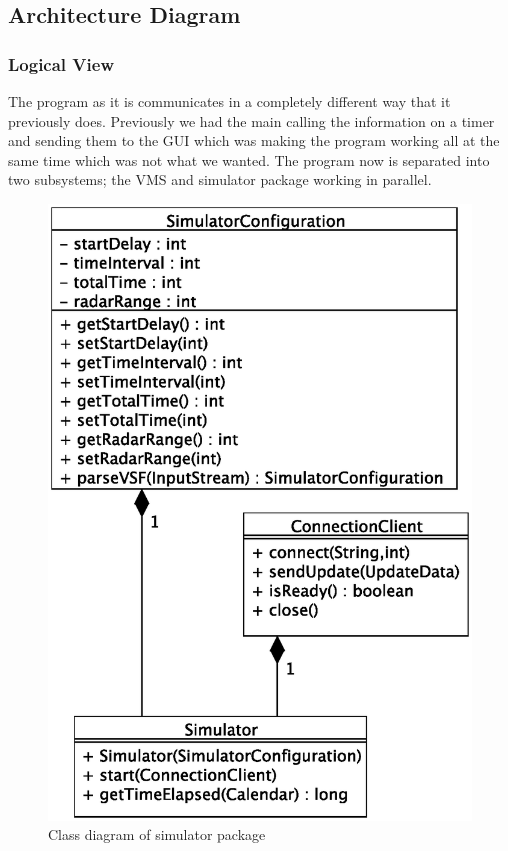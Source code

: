 \documentclass{article}
\begin{document}
\subsection{Architecture Diagram}

\subsubsection{Logical View}

The program as it is communicates in a completely different way that it previously does. Previously we had the main calling the information on a timer and sending them to the GUI which was making the program working all at the same time which was not what we wanted. The program now is separated into two subsystems; the VMS and simulator package working in parallel.

\begin{figure}[h]
\caption{Class diagram of simulator package}
\includegraphics[width=\linewidth]{diagrams/simulator-class-diagram.eps}
\end{figure}
\end{document}
